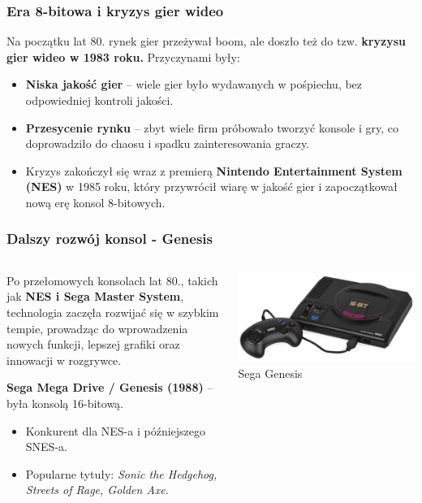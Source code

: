 \documentclass[8pt]{beamer}
\begin{document}
\begin{frame}
\frametitle{Era 8-bitowa i kryzys gier wideo}
Na początku lat 80. rynek gier przeżywał boom, ale doszło też do tzw. \textbf {kryzysu gier wideo w 1983 roku.} Przyczynami były:
\begin{itemize}
\item \textbf {Niska jakość gier} – wiele gier było wydawanych w pośpiechu, bez odpowiedniej kontroli jakości.
\item \textbf {Przesycenie rynku} – zbyt wiele firm próbowało tworzyć konsole i gry, co doprowadziło do chaosu i spadku zainteresowania graczy.
\item Kryzys zakończył się wraz z premierą \textbf {Nintendo Entertainment System (NES)} w 1985 roku, który przywrócił wiarę w jakość gier i zapoczątkował nową erę konsol 8-bitowych.
\end{itemize}
\end{frame}


\begin{frame}
\frametitle{Dalszy rozwój konsol - Genesis}
\begin{columns}

    \begin{column}{0.6\textwidth}
        Po przełomowych konsolach lat 80., takich jak \textbf{NES i Sega Master System}, technologia zaczęła rozwijać się w szybkim tempie, prowadząc do wprowadzenia nowych funkcji, lepszej grafiki oraz innowacji w rozgrywce.
        
        \vspace{0.5em}
        \textbf{Sega Mega Drive / Genesis (1988)} – była konsolą 16-bitową.
        \begin{itemize}
            \item Konkurent dla NES-a i późniejszego SNES-a.
            \item Popularne tytuły: \textit{Sonic the Hedgehog, Streets of Rage, Golden Axe}.
        \end{itemize}
    \end{column}

    \begin{column}{0.35\textwidth}
        \centering
        \includegraphics[width=\textwidth]{sega.jpg} 
        {\small Sega Genesis} 
    \end{column}
\end{columns}
\end{frame}
\end{document}
